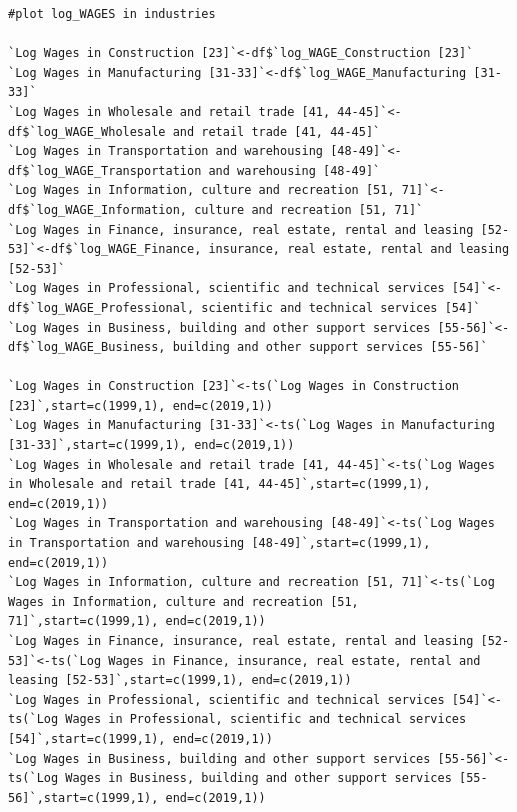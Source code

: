 \documentclass[12pt]{article}
\begin{document}
\begin{verbatim}
#plot log_WAGES in industries

`Log Wages in Construction [23]`<-df$`log_WAGE_Construction [23]`
`Log Wages in Manufacturing [31-33]`<-df$`log_WAGE_Manufacturing [31-33]`
`Log Wages in Wholesale and retail trade [41, 44-45]`<-df$`log_WAGE_Wholesale and retail trade [41, 44-45]`
`Log Wages in Transportation and warehousing [48-49]`<-df$`log_WAGE_Transportation and warehousing [48-49]`
`Log Wages in Information, culture and recreation [51, 71]`<-df$`log_WAGE_Information, culture and recreation [51, 71]`
`Log Wages in Finance, insurance, real estate, rental and leasing [52-53]`<-df$`log_WAGE_Finance, insurance, real estate, rental and leasing [52-53]`
`Log Wages in Professional, scientific and technical services [54]`<-df$`log_WAGE_Professional, scientific and technical services [54]`
`Log Wages in Business, building and other support services [55-56]`<-df$`log_WAGE_Business, building and other support services [55-56]`

`Log Wages in Construction [23]`<-ts(`Log Wages in Construction [23]`,start=c(1999,1), end=c(2019,1))
`Log Wages in Manufacturing [31-33]`<-ts(`Log Wages in Manufacturing [31-33]`,start=c(1999,1), end=c(2019,1))
`Log Wages in Wholesale and retail trade [41, 44-45]`<-ts(`Log Wages in Wholesale and retail trade [41, 44-45]`,start=c(1999,1), end=c(2019,1))
`Log Wages in Transportation and warehousing [48-49]`<-ts(`Log Wages in Transportation and warehousing [48-49]`,start=c(1999,1), end=c(2019,1))
`Log Wages in Information, culture and recreation [51, 71]`<-ts(`Log Wages in Information, culture and recreation [51, 71]`,start=c(1999,1), end=c(2019,1))
`Log Wages in Finance, insurance, real estate, rental and leasing [52-53]`<-ts(`Log Wages in Finance, insurance, real estate, rental and leasing [52-53]`,start=c(1999,1), end=c(2019,1))
`Log Wages in Professional, scientific and technical services [54]`<-ts(`Log Wages in Professional, scientific and technical services [54]`,start=c(1999,1), end=c(2019,1))
`Log Wages in Business, building and other support services [55-56]`<-ts(`Log Wages in Business, building and other support services [55-56]`,start=c(1999,1), end=c(2019,1))


\end{verbatim}
\end{document}
